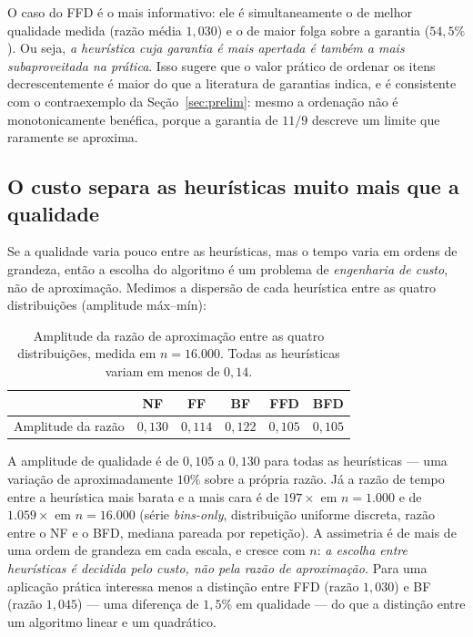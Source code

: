 \documentclass[12pt]{article}
\begin{document}
O caso do FFD é o mais informativo: ele é simultaneamente o de melhor qualidade medida (razão média $1{,}030$) e o de maior folga sobre a garantia ($54{,}5\%$). Ou seja, \emph{a heurística cuja garantia é mais apertada é também a mais subaproveitada na prática}. Isso sugere que o valor prático de ordenar os itens decrescentemente é maior do que a literatura de garantias indica, e é consistente com o contraexemplo da Seção~\ref{sec:prelim}: mesmo a ordenação não é monotonicamente benéfica, porque a garantia de $11/9$ descreve um limite que raramente se aproxima.

\subsection{O custo separa as heurísticas muito mais que a qualidade}

Se a qualidade varia pouco entre as heurísticas, mas o tempo varia em ordens de grandeza, então a escolha do algoritmo é um problema de \emph{engenharia de custo}, não de aproximação. Medimos a dispersão de cada heurística entre as quatro distribuições (amplitude máx--mín):

\begin{table}[ht]
\centering
\caption{Amplitude da razão de aproximação entre as quatro distribuições, medida em $n = 16.000$. Todas as heurísticas variam em menos de $0{,}14$.}
\label{tab:amplitude}
\footnotesize
\begin{tabular}{@{}lccccc@{}}
\toprule
 & NF & FF & BF & FFD & BFD \\
\midrule
Amplitude da razão & $0{,}130$ & $0{,}114$ & $0{,}122$ & $0{,}105$ & $0{,}105$ \\
\bottomrule
\end{tabular}
\end{table}

A amplitude de qualidade é de $0{,}105$ a $0{,}130$ para todas as heurísticas --- uma variação de aproximadamente $10\%$ sobre a própria razão. Já a razão de tempo entre a heurística mais barata e a mais cara é de $197\times$ em $n = 1.000$ e de $1.059\times$ em $n = 16.000$ (série \textit{bins-only}, distribuição uniforme discreta, razão entre o NF e o BFD, mediana pareada por repetição). A assimetria é de mais de uma ordem de grandeza em cada escala, e cresce com $n$: \emph{a escolha entre heurísticas é decidida pelo custo, não pela razão de aproximação.} Para uma aplicação prática interessa menos a distinção entre FFD (razão $1{,}030$) e BF (razão $1{,}045$) --- uma diferença de $1{,}5\%$ em qualidade --- do que a distinção entre um algoritmo linear e um quadrático.
\end{document}
